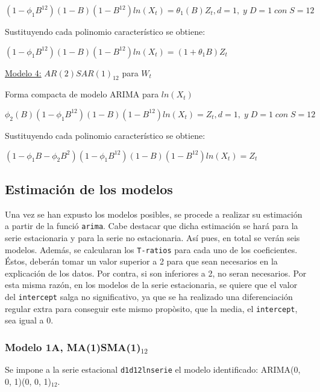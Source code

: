 \documentclass[
]{article}
\begin{document}
\((1-\phi_1B^{12})(1-B)(1-B^{12}) ln(X_t) =\theta_1(B)Z_t, d = 1,\; y \; D = 1 \; con \; S = 12\)

Sustituyendo cada polinomio característico se obtiene:

\((1-\phi_1B^{12})(1-B)(1-B^{12}) ln(X_t) = (1+\theta_1B)Z_t\)

\medskip

\underline{Modelo 4:} \(AR(2)SAR(1)_{12}\) para \(W_t\)

Forma compacta de modelo ARIMA para \(ln(X_t)\)

\(\phi_2(B)(1-\phi_1B^{12})(1-B)(1-B^{12}) ln(X_t) = Z_t, d = 1,\; y \; D = 1 \; con \; S = 12\)

Sustituyendo cada polinomio característico se obtiene:

\((1-\phi_1B-\phi_2B^2)(1-\phi_1B^{12})(1-B)(1-B^{12}) ln(X_t) = Z_t\)

\hypertarget{estimaciuxf3n-de-los-modelos}{%
\subsection{Estimación de los
modelos}\label{estimaciuxf3n-de-los-modelos}}

Una vez se han expusto los modelos posibles, se procede a realizar su
estimación a partir de la funció \texttt{arima}. Cabe destacar que dicha
estimación se hará para la serie estacionaria y para la serie no
estacionaria. Así pues, en total se verán seis modelos. Además, se
calcularan los \texttt{T-ratios} para cada uno de los coeficientes.
Éstos, deberán tomar un valor superior a 2 para que sean necesarios en
la explicación de los datos. Por contra, si son inferiores a 2, no seran
necesarios. Por esta misma razón, en los modelos de la serie
estacionaria, se quiere que el valor del \texttt{intercept} salga no
significativo, ya que se ha realizado una diferenciación regular extra
para conseguir este mismo propòsito, que la media, el
\texttt{intercept}, sea igual a 0.

\medskip

\hypertarget{modelo-1a-ma1sma1_12}{%
\subsubsection{\texorpdfstring{Modelo 1A,
MA(1)SMA(1)\(_{12}\)}{Modelo 1A, MA(1)SMA(1)\_\{12\}}}\label{modelo-1a-ma1sma1_12}}

Se impone a la serie estacional \texttt{d1d12lnserie} el modelo
identificado: ARIMA(0, 0, 1)(0, 0, 1)\(_{12}\).
\end{document}
